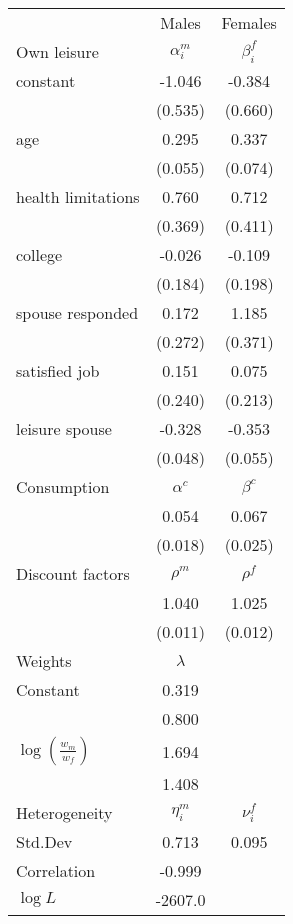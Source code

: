 \begin{tabular}{lcc} 
\hline\hline 
 & Males & Females \\ 
Own leisure & $\alpha_{i}^{m}$ & $\beta_{i}^{f}$ \\ 
constant & -1.046 & -0.384 \\ 
 & (0.535) & (0.660) \\ 
age & 0.295 & 0.337 \\ 
 & (0.055) & (0.074) \\ 
health limitations & 0.760 & 0.712 \\ 
 & (0.369) & (0.411) \\ 
college & -0.026 & -0.109 \\ 
 & (0.184) & (0.198) \\ 
spouse responded & 0.172 & 1.185 \\ 
 & (0.272) & (0.371) \\ 
satisfied job & 0.151 & 0.075 \\ 
 & (0.240) & (0.213) \\ 
leisure spouse & -0.328 & -0.353 \\ 
 & (0.048) & (0.055) \\ 
Consumption & $\alpha^{c}$ & $\beta^{c}$ \\ 
 & 0.054 & 0.067 \\ 
 & (0.018) & (0.025) \\ 
Discount factors & $\rho^m$ & $\rho^f$ \\ 
 & 1.040 & 1.025 \\ 
 & (0.011) & (0.012) \\ 
Weights & $\lambda$ &  \\ 
Constant & 0.319 &  \\ 
 & 0.800 &  \\ 
$\log(\frac{w_m}{w_f})$ & 1.694 &  \\ 
 & 1.408 &  \\ 
Heterogeneity & $\eta_i^m$ & $\nu_i^f$ \\ 
Std.Dev & 0.713 & 0.095 \\ 
Correlation & -0.999 &  \\ 
\hline 
$\log L$ & -2607.0 & \\ 
\hline \hline 
\end{tabular} 
